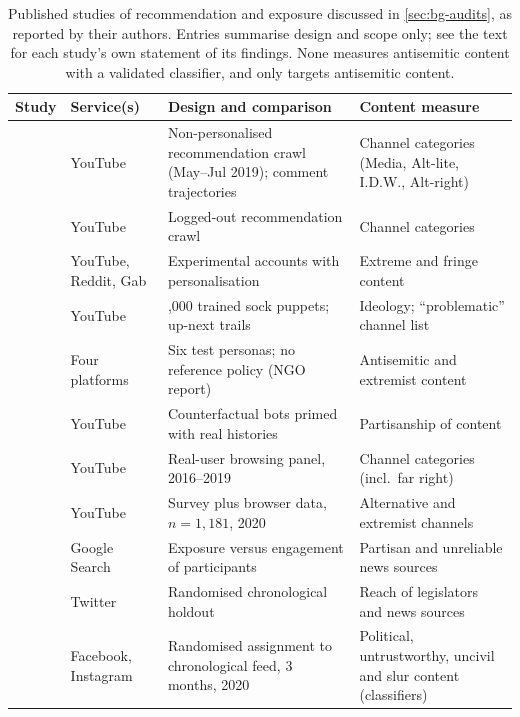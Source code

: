 \begin{table}[!tbp]
\centering
\caption{Published studies of recommendation and exposure discussed in \cref{sec:bg-audits}, as reported by their authors. Entries summarise design and scope only; see the text for each study's own statement of its findings. None measures antisemitic content with a validated classifier, and only \citet{adl2023badtoworse} targets antisemitic content.}\label{tab:bg-studies}
\footnotesize
\setlength{\tabcolsep}{4pt}
\renewcommand{\arraystretch}{1.15}
\begin{tabularx}{\textwidth}{@{}>{\raggedright\arraybackslash}p{2.6cm}>{\raggedright\arraybackslash}p{2.0cm}>{\raggedright\arraybackslash}X>{\raggedright\arraybackslash}p{3.6cm}@{}}
\toprule
Study & Service(s) & Design and comparison & Content measure \\
\midrule
\citet{ribeiro2020} & YouTube & Non-personalised recommendation crawl (May--Jul 2019); comment trajectories & Channel categories (Media, Alt-lite, I.D.W., Alt-right) \\
\citet{ledwich2020} & YouTube & Logged-out recommendation crawl & Channel categories \\
\citet{whittaker2021} & YouTube, Reddit, Gab & Experimental accounts with personalisation & Extreme and fringe content \\
\citet{haroon2023} & YouTube & 100,000 trained sock puppets; up-next trails & Ideology; ``problematic'' channel list \\
\citet{adl2023badtoworse} & Four platforms & Six test personas; no reference policy (NGO report) & Antisemitic and extremist content \\
\citet{hosseinmardi2024} & YouTube & Counterfactual bots primed with real histories & Partisanship of content \\
\citet{hosseinmardi2021} & YouTube & Real-user browsing panel, 2016--2019 & Channel categories (incl.\ far right) \\
\citet{chen2023} & YouTube & Survey plus browser data, $n=1{,}181$, 2020 & Alternative and extremist channels \\
\citet{robertson2023} & Google Search & Exposure versus engagement of participants & Partisan and unreliable news sources \\
\citet{huszar2022} & Twitter & Randomised chronological holdout & Reach of legislators and news sources \\
\citet{guess2023} & Facebook, Instagram & Randomised assignment to chronological feed, 3 months, 2020 & Political, untrustworthy, uncivil and slur content (classifiers) \\
\bottomrule
\end{tabularx}
\end{table}

